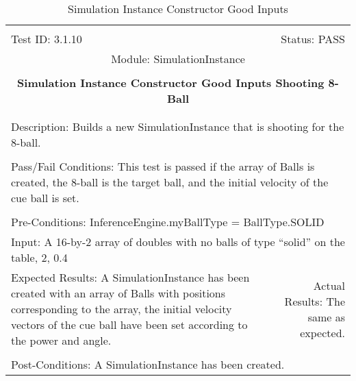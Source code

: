\documentclass[titlepage]{article}
\begin{document}
\begin{center}
\begin{table}[h!]
\begin{tabular}{|l r|}\hline&\\[-2mm]
	Test ID: 3.1.10	&Status: PASS\\[-3mm]
	\multicolumn{2}{|c|}{Module: SimulationInstance}\\&\\
	\multicolumn{2}{|c|}{\textbf{\large{Simulation Instance Constructor Good Inputs Shooting 8-Ball}}}\\&\\\hline&\\[-3mm]
	\multicolumn{2}{|p{\textwidth}|}{Description: Builds a new SimulationInstance that is shooting for the 8-ball.}\\[1mm]\hline&\\[-3mm]
	\multicolumn{2}{|p{\textwidth}|}{Pass/Fail Conditions: This test is passed if the array of Balls is created, the 8-ball is the target ball, and the initial velocity of the cue ball is set.}\\[1mm]\hline&\\[-3mm]
	\multicolumn{2}{|p{\textwidth}|}{Pre-Conditions: InferenceEngine.myBallType = BallType.SOLID}\\[4mm]
	\multicolumn{2}{|p{\textwidth}|}{Input: A 16-by-2 array of doubles with no balls of type ``solid'' on the table, 2, 0.4}\\[2mm]\hline
	\multicolumn{1}{|p{0.49\textwidth}}{Expected Results: A SimulationInstance has been created with an array of Balls with positions corresponding to the array, the initial velocity vectors of the cue ball have been set according to the power and angle.}	&\multicolumn{1}{|p{0.45\textwidth}|}{Actual Results: The same as expected.}\\\hline&\\[-3mm]
	\multicolumn{2}{|p{\textwidth}|}{Post-Conditions: A SimulationInstance has been created.}\\\hline
\end{tabular}
\caption{Simulation Instance Constructor Good Inputs}
\end{table}
\end{center}
\end{document}
